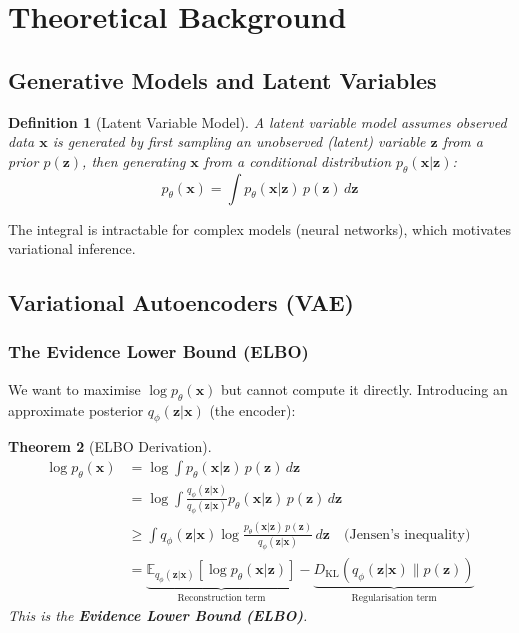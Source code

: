 \documentclass[11pt,a4paper]{article}
\newtheorem{theorem}{Theorem}[section]
\newtheorem{definition}[theorem]{Definition}
\begin{document}
\section{Theoretical Background}

\subsection{Generative Models and Latent Variables}

\begin{definition}[Latent Variable Model]
A latent variable model assumes observed data $\mathbf{x}$ is generated by first sampling an unobserved (latent) variable $\mathbf{z}$ from a prior $p(\mathbf{z})$, then generating $\mathbf{x}$ from a conditional distribution $p_\theta(\mathbf{x} | \mathbf{z})$:
\[
p_\theta(\mathbf{x}) = \int p_\theta(\mathbf{x} | \mathbf{z})\, p(\mathbf{z})\, d\mathbf{z}
\]
\end{definition}

The integral is intractable for complex models (neural networks), which motivates variational inference.

\subsection{Variational Autoencoders (VAE)}

\subsubsection{The Evidence Lower Bound (ELBO)}

We want to maximise $\log p_\theta(\mathbf{x})$ but cannot compute it directly. Introducing an approximate posterior $q_\phi(\mathbf{z} | \mathbf{x})$ (the encoder):

\begin{theorem}[ELBO Derivation]
\begin{align}
\log p_\theta(\mathbf{x}) &= \log \int p_\theta(\mathbf{x} | \mathbf{z})\, p(\mathbf{z})\, d\mathbf{z} \\
&= \log \int \frac{q_\phi(\mathbf{z}|\mathbf{x})}{q_\phi(\mathbf{z}|\mathbf{x})} p_\theta(\mathbf{x}|\mathbf{z})\, p(\mathbf{z})\, d\mathbf{z} \\
&\geq \int q_\phi(\mathbf{z}|\mathbf{x}) \log \frac{p_\theta(\mathbf{x}|\mathbf{z})\, p(\mathbf{z})}{q_\phi(\mathbf{z}|\mathbf{x})}\, d\mathbf{z} \quad \text{(Jensen's inequality)} \\
&= \underbrace{\mathbb{E}_{q_\phi(\mathbf{z}|\mathbf{x})}\left[\log p_\theta(\mathbf{x}|\mathbf{z})\right]}_{\text{Reconstruction term}} - \underbrace{D_{\mathrm{KL}}\left(q_\phi(\mathbf{z}|\mathbf{x}) \| p(\mathbf{z})\right)}_{\text{Regularisation term}}
\end{align}
This is the \textbf{Evidence Lower Bound (ELBO)}.
\end{theorem}
\end{document}
